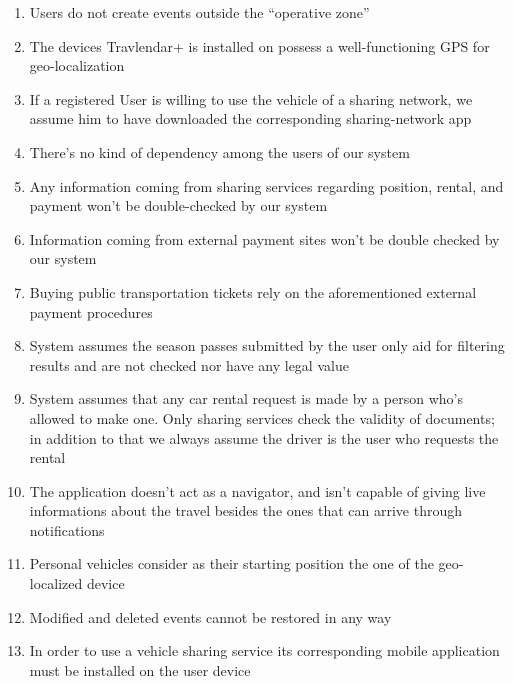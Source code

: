 	\begin{enumerate}
		
			\item Users do not create events outside the “operative zone”

			\item The devices Travlendar+ is installed on possess a well-functioning GPS for geo-localization

			\item If a registered User is willing to use the vehicle of a sharing network, we assume him to have downloaded the corresponding sharing-network app

			\item There’s no kind of dependency among the users of our system

			\item Any information coming from sharing services regarding position, rental, and payment won’t be double-checked by our system

			\item Information coming from external payment sites won’t be double checked by our system

			\item Buying public transportation tickets rely on the aforementioned external payment procedures

			\item System assumes the season passes submitted by the user only aid for filtering results and are not checked nor have any legal value

			\item System assumes that any car rental request is made by a person who’s allowed to make one. Only sharing services check the validity of documents; in addition to that we always assume the driver is the user who requests the rental

			\item The application doesn't act as a navigator, and isn't capable of giving live informations about the travel besides the ones that can arrive through notifications
			
			\item Personal vehicles consider as their starting position the one of the geo-localized device
			
			\item Modified and deleted events cannot be restored in any way
			
			\item In order to use a vehicle sharing service its corresponding mobile application must be installed on the user device 
			
		\end{enumerate}
